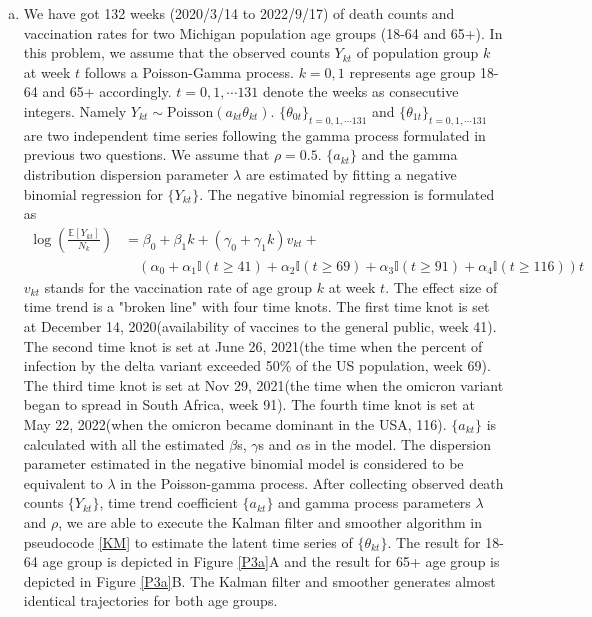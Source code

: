 \documentclass[12pt]{article}
\begin{document}
\begin{enumerate}[(a)]
	\item We have got 132 weeks (2020/3/14 to 2022/9/17) of death counts and vaccination rates for two Michigan population age groups (18-64 and 65+). In this problem, we assume that the observed counts $Y_{kt}$ of population group $k$ at week $t$ follows a Poisson-Gamma process. $k=0,1$ represents age group 18-64 and 65+ accordingly. $t=0,1,\cdots 131$ denote the weeks as consecutive integers. Namely $Y_{kt} \sim \text{Poisson}(a_{kt}\theta_{kt})$. $\{\theta_{0t}\}_{t=0,1,\cdots 131}$ and $\{\theta_{1t}\}_{t=0,1,\cdots 131}$ are two independent time series following the gamma process formulated in previous two questions. We assume that $\rho = 0.5$. $\{a_{kt}\}$ and the gamma distribution dispersion parameter $\lambda$ are estimated by fitting a negative binomial regression for $\{Y_{kt}\}$. The negative binomial regression is formulated as 
	\begin{align*}
		\log(\frac{\mathbb{E}[Y_{kt}]}{N_{k}}) &= \beta_{0} + \beta_{1}k +(\gamma_{0} + \gamma_{1}k) v_{kt} +\\ 
		&\quad \left(\alpha_{0} + \alpha_{1}\mathbb{I}(t \geq 41) + \alpha_{2}\mathbb{I}(t \geq 69) +\alpha_{3} \mathbb{I}(t \geq 91) + \alpha_{4}\mathbb{I}(t \geq 116)\right) t
	\end{align*}	
	$v_{kt}$ stands for the vaccination rate of age group $k$ at week $t$. The effect size of time trend is a "broken line" with four time knots. The first time knot is set at December 14, 2020(availability of vaccines to the general public, week 41). The second time knot is set at June 26, 2021(the time when the percent of infection by the delta variant exceeded 50\% of the US population, week 69). The third time knot is set at Nov 29, 2021(the time when the omicron variant began to spread in South Africa, week 91). The fourth time knot is set at May 22, 2022(when the omicron became dominant in the USA, 116). $\{a_{kt}\}$ is calculated with all the estimated $\beta$s, $\gamma$s and $\alpha$s in the model. The dispersion parameter estimated in the negative binomial model is considered to be equivalent to $\lambda$ in the Poisson-gamma process. After collecting observed death counts $\{Y_{kt}\}$, time trend coefficient $\{a_{kt}\}$ and gamma process parameters $\lambda$ and $\rho$, we are able to execute the Kalman filter and smoother algorithm in pseudocode \ref{KM} to estimate the latent time series of $\{\theta_{kt} \}$. The result for 18-64 age group is depicted in Figure \ref{P3a}A and the result for 65+ age group is depicted in Figure \ref{P3a}B. The Kalman filter and smoother generates almost identical trajectories for both age groups.	
	

\end{enumerate}
\end{document}
